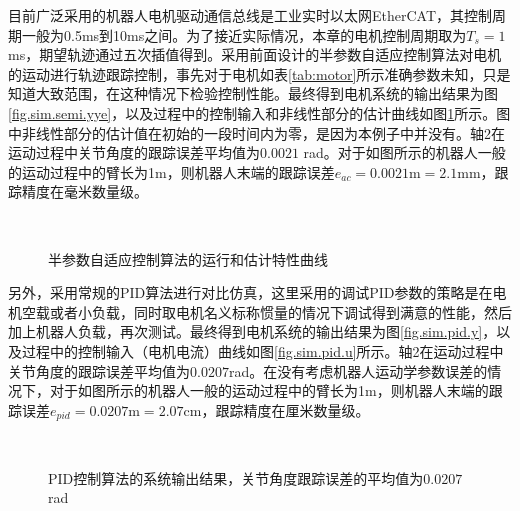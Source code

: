 目前广泛采用的机器人电机驱动通信总线是工业实时以太网EtherCAT，其控制周期一般为0.5ms到10ms之间。为了接近实际情况，本章的电机控制周期取为$T_{s}=1$ms，期望轨迹通过五次插值得到。采用前面设计的半参数自适应控制算法对电机的运动进行轨迹跟踪控制，事先对于电机如表\ref{tab:motor}所示准确参数未知，只是知道大致范围，在这种情况下检验控制性能。最终得到电机系统的输出结果为图\ref{fig.sim.semi.yye}，以及过程中的控制输入和非线性部分的估计曲线如图\ref{fig.sim.semi.a}所示。图中非线性部分的估计值在初始的一段时间内为零，是因为本例子中并没有。轴2在运动过程中关节角度的跟踪误差平均值为$0.0021$ rad。对于如图所示的机器人一般的运动过程中的臂长为1m，则机器人末端的跟踪误差$e_{ac}=0.0021$m$=2.1$mm，跟踪精度在毫米数量级。

\begin{figure}[!htb]
	\centering
	\\
	\caption{半参数自适应控制算法的运行和估计特性曲线}
	\label{fig.sim.semi.a}
\end{figure}

另外，采用常规的PID算法进行对比仿真，这里采用的调试PID参数的策略是在电机空载或者小负载，同时取电机名义标称惯量的情况下调试得到满意的性能，然后加上机器人负载，再次测试。最终得到电机系统的输出结果为图\ref{fig.sim.pid.y}，以及过程中的控制输入（电机电流）曲线如图\ref{fig.sim.pid.u}所示。轴2在运动过程中关节角度的跟踪误差平均值为$0.0207$rad。在没有考虑机器人运动学参数误差的情况下，对于如图所示的机器人一般的运动过程中的臂长为1m，则机器人末端的跟踪误差$e_{pid}=0.0207$m$=2.07$cm，跟踪精度在厘米数量级。

\begin{figure}[!htb]
	\centering
	\\
	\caption{PID控制算法的系统输出结果，关节角度跟踪误差的平均值为$0.0207$rad}
	\label{fig.sim.pid.yye}
\end{figure}

